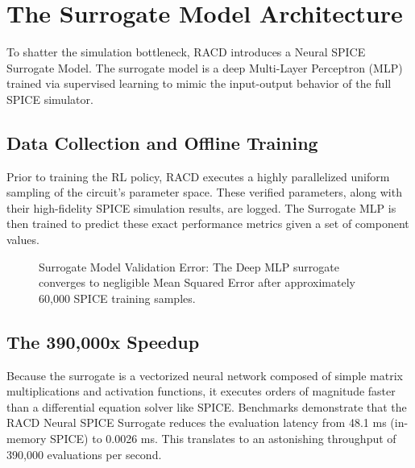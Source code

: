 \documentclass[11pt, a4paper]{article}
\begin{document}
\section{The Surrogate Model Architecture}
To shatter the simulation bottleneck, RACD introduces a Neural SPICE Surrogate Model. The surrogate model is a deep Multi-Layer Perceptron (MLP) trained via supervised learning to mimic the input-output behavior of the full SPICE simulator.

\subsection*{Data Collection and Offline Training}
Prior to training the RL policy, RACD executes a highly parallelized uniform sampling of the circuit's parameter space. These verified parameters, along with their high-fidelity SPICE simulation results, are logged. The Surrogate MLP is then trained to predict these exact performance metrics given a set of component values.

\begin{figure}[!htbp]
    \centering
    \caption{Surrogate Model Validation Error: The Deep MLP surrogate converges to negligible Mean Squared Error after approximately 60,000 SPICE training samples.}
\end{figure}

\subsection*{The 390,000x Speedup}
Because the surrogate is a vectorized neural network composed of simple matrix multiplications and activation functions, it executes orders of magnitude faster than a differential equation solver like SPICE. Benchmarks demonstrate that the RACD Neural SPICE Surrogate reduces the evaluation latency from 48.1 ms (in-memory SPICE) to 0.0026 ms. This translates to an astonishing throughput of 390,000 evaluations per second. 
\end{document}
